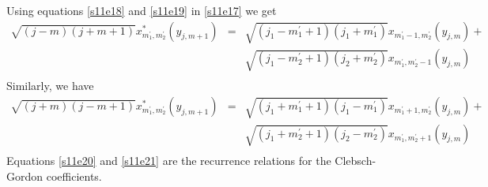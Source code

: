 \documentclass{article}
\numberwithin{equation}{section}
\theoremstyle{plain}
\numberwithin{thm}{section}
\theoremstyle{plain}
\numberwithin{prop}{section}
\theoremstyle{definition}
\numberwithin{defn}{section}
\theoremstyle{remark}
\begin{document}
Using equations \eqref{s11e18} and \eqref{s11e19} in \eqref{s11e17} we get
{\tiny
\begin{eqnarray}
\sqrt{(j-m)(j+m+1)}x_{m_1^\prime,m_2^\prime}^\ast(y_{j,m+1}) &=&
\sqrt{(j_1-m_1^\prime+1)(j_1+m_1^\prime)}x_{m_1^\prime-1,m_2^\prime}
     (y_{j,m}) + \nonumber \\
 & & \sqrt{(j_1-m_2^\prime+1)(j_2+m_2^\prime)}x_{m_1^\prime,m_2^\prime-1}
     (y_{j,m}) \nonumber \\
 & & \label{s11e20}
\end{eqnarray}}
Similarly, we have
{\tiny
\begin{eqnarray}
\sqrt{(j+m)(j-m+1)}x_{m_1^\prime,m_2^\prime}^\ast(y_{j,m+1}) &=&
\sqrt{(j_1+m_1^\prime+1)(j_1-m_1^\prime)}x_{m_1^\prime+1,m_2^\prime}
     (y_{j,m}) + \nonumber \\
 & & \sqrt{(j_1+m_2^\prime+1)(j_2-m_2^\prime)}x_{m_1^\prime,m_2^\prime+1}
     (y_{j,m}) \nonumber \\
 & & \label{s11e21}
\end{eqnarray}}
Equations \eqref{s11e20} and \eqref{s11e21} are the recurrence relations for
the Clebsch-Gordon coefficients.
\end{document}
